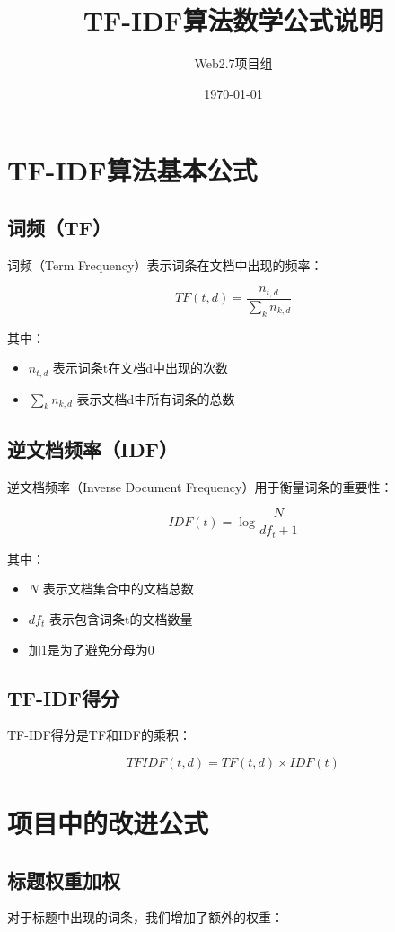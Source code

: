 \documentclass{article}
\title{TF-IDF算法数学公式说明}
\author{Web2.7项目组}
\date{\today}
\begin{document}
\begin{CJK}{UTF8}{gbsn}

\maketitle

\section{TF-IDF算法基本公式}

\subsection{词频（TF）}
词频（Term Frequency）表示词条在文档中出现的频率：

\[
TF(t,d) = \frac{n_{t,d}}{\sum_{k} n_{k,d}}
\]

其中：
\begin{itemize}
\item $n_{t,d}$ 表示词条t在文档d中出现的次数
\item $\sum_{k} n_{k,d}$ 表示文档d中所有词条的总数
\end{itemize}

\subsection{逆文档频率（IDF）}
逆文档频率（Inverse Document Frequency）用于衡量词条的重要性：

\[
IDF(t) = \log\frac{N}{df_t + 1}
\]

其中：
\begin{itemize}
\item $N$ 表示文档集合中的文档总数
\item $df_t$ 表示包含词条t的文档数量
\item 加1是为了避免分母为0
\end{itemize}

\subsection{TF-IDF得分}
TF-IDF得分是TF和IDF的乘积：

\[
TFIDF(t,d) = TF(t,d) \times IDF(t)
\]

\section{项目中的改进公式}

\subsection{标题权重加权}
对于标题中出现的词条，我们增加了额外的权重：


\end{CJK}
\end{document}
